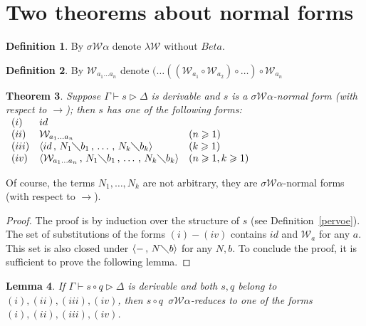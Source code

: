 \documentclass[11pt]{amsart}
\theoremstyle{plain}
\newtheorem{theorem}{Theorem}[section]
\newtheorem{lemma}[theorem]{Lemma}
\theoremstyle{definition}
\newtheorem{definition}[theorem]{Definition}
\theoremstyle{remark}
\numberwithin{equation}{section}
\newcommand{\tri}{\triangleright}
\newcommand{\ci}{\circ}
\newcommand{\mi}{\,,\,}
\newcommand{\is}{\diagdown}
\newcommand{\arrow}{\rightarrow}
\newcommand{\la}{\langle}
\newcommand{\ra}{\rangle}
\newcommand{\x}{a}
\newcommand{\y}{b}
\renewcommand{\pi}{\mathcal{W}}
\begin{document}
\section{Two theorems about normal forms}
\begin{definition}By $\sigma\pi\alpha$ denote $\lambda\pi$ without
$Beta$.
\end{definition}
\begin{definition}By $\pi_{\x_1\ldots\x_n}$ denote
$(\ldots((\pi_{\x_1}\ci\pi_{\x_2})\ci\ldots)\ci\pi_{\x_n}$
\end{definition}
\begin{theorem}\label{Subnf}Suppose $\Gamma\vdash s\tri\Delta$ is derivable
and $s$ is a $\sigma\pi\alpha$-normal form (with respect to
$\arrow$); then $s$ has one of the following forms:\\ $
\begin{array}{lll}
(i) & id &\\
(ii) & \pi_{\x_1\ldots\x_n} & (n\geqslant 1)\\
(iii) & \la id\mi N_1\is \y_1\mi\ldots\mi N_k\is \y_k\ra &
(k\geqslant
1)\\
(iv) & \la\pi_{\x_1\ldots\x_n}\mi N_1\is \y_1\mi\ldots\mi N_k\is
\y_k\ra & (n\geqslant 1, k\geqslant 1)
\end{array}
$\\
\end{theorem}
Of course, the terms $N_1,\ldots,N_k$ are not arbitrary, they are
$\sigma\pi\alpha$-normal forms (with respect to $\arrow$).
\begin{proof}The proof is by induction over the structure of $s$ (see Definition~\ref{pervoe}). The set of substitutions of the forms $(i)-(iv)$ contains $id$ and
$\pi_{\x}$ for any $\x$. This set  is also closed under
 $\la - \mi N\is \y\ra$ for any $N,\y$. To conclude the proof, it is sufficient to prove the
 following
lemma.
\end{proof}
\begin{lemma}If $\Gamma\vdash s\ci q\tri\Delta$ is derivable and
both $s,q$ belong to $(i),(ii),(iii),(iv)$, then $s\ci q\,$
$\sigma\pi\alpha$-reduces to one of the forms
$(i),(ii),(iii),(iv)$.
\end{lemma}
\end{document}
